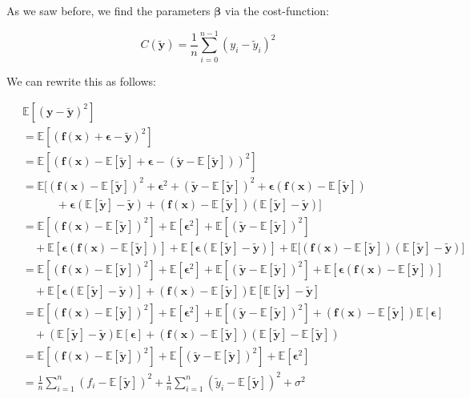 \documentclass[12pt]{extarticle}
\begin{document}
As we saw before, we find the parameters $\bm{\beta}$ via the cost-function: 

\begin{equation*}
    C(\bm{\tilde{y}}) = \frac{1}{n} \sum_{i=0}^{n-1} (y_i - \tilde{y}_i)^2
\end{equation*}

We can rewrite this as follows:

\begin{equation*}
\begin{aligned}
 &\mathds{E}[(\bm{y}-\bm{\tilde{y}})^2]\\
 &=\mathds{E}[(\bm{f}(\bm{x})+\bm{\epsilon}-\bm{\tilde{y}})^2]\\
 &= \mathds{E}[(\bm{f}(\bm{x})-\mathds{E}[\bm{\tilde{y}}]+\bm{\epsilon}-(\bm{\tilde{y}}-\mathds{E}[\bm{\tilde{y}}]))^2]\\
 &= \mathds{E}\Big[(\bm{f}(\bm{x})-\mathds{E}[\bm{\tilde{y}}])^2+\bm{\epsilon}^2+(\bm{\tilde{y}}-\mathds{E}[\bm{\tilde{y}}])^2+\bm{\epsilon}(\bm{f}(\bm{x})-\mathds{E}[\bm{\tilde{y}}])\\
 &\qquad \quad +\bm{\epsilon}(\mathds{E}[\bm{\tilde{y}}]-\bm{\tilde{y}})+(\bm{f}(\bm{x})-\mathds{E}[\bm{\tilde{y}}])(\mathds{E}[\bm{\tilde{y}}]-\bm{\tilde{y}})\Big]\\\
 &= \mathds{E}[(\bm{f}(\bm{x})-\mathds{E}[\bm{\tilde{y}}])^2] + \mathds{E}[\bm{\epsilon}^2] + \mathds{E}[(\bm{\tilde{y}}-\mathds{E}[\bm{\tilde{y}}])^2]\\
 &\quad+\mathds{E}[\bm{\epsilon}(\bm{f}(\bm{x})-\mathds{E}[\bm{\tilde{y}}])] +  \mathds{E}[\bm{\epsilon}(\mathds{E}[\bm{\tilde{y}}]-\bm{\tilde{y}})] + \mathds{E}\big[(\bm{f}(\bm{x})-\mathds{E}[\bm{\tilde{y}}])(\mathds{E}[\bm{\tilde{y}}]-\bm{\tilde{y}})\big]\\
 &= \mathds{E}[(\bm{f}(\bm{x})-\mathds{E}[\bm{\tilde{y}}])^2] + \mathds{E}[\bm{\epsilon}^2] + \mathds{E}[(\bm{\tilde{y}}-\mathds{E}[\bm{\tilde{y}}])^2]+ \mathds{E}[\bm{\epsilon}(\bm{f}(\bm{x})-\mathds{E}[\bm{\tilde{y}}])] \\
 &\quad+\mathds{E}[\bm{\epsilon}(\mathds{E}[\bm{\tilde{y}}]-\bm{\tilde{y}})] + (\bm{f}(\bm{x})-\mathds{E}[\bm{\tilde{y}}])\mathds{E}[\mathds{E}[\bm{\tilde{y}}]-\bm{\tilde{y}}]\\
  &= \mathds{E}[(\bm{f}(\bm{x})-\mathds{E}[\bm{\tilde{y}}])^2] + \mathds{E}[\bm{\epsilon}^2] + \mathds{E}[(\bm{\tilde{y}}-\mathds{E}[\bm{\tilde{y}}])^2]+ (\bm{f}(\bm{x})-\mathds{E}[\bm{\tilde{y}}])\mathds{E}[\bm{\epsilon}] \\
 &\quad+(\mathds{E}[\bm{\tilde{y}}]-\bm{\tilde{y}})\mathds{E}[\bm{\epsilon}] + (\bm{f}(\bm{x})-\mathds{E}[\bm{\tilde{y}}])(\mathds{E}[\bm{\tilde{y}}]-\mathds{E}[\bm{\tilde{y}}])\\
&= \mathds{E}[(\bm{f}(\bm{x})-\mathds{E}[\bm{\tilde{y}}])^2] + \mathds{E}[(\bm{\tilde{y}}-\mathds{E}[\bm{\tilde{y}}])^2] + \mathds{E}[\bm{\epsilon}^2]\\
 &= \frac{1}{n} \sum_{i=1}^n (f_i - \mathds{E}[\bm{\tilde{y}}])^2 + \frac{1}{n} \sum_{i=1}^n (\tilde{y}_i - \mathds{E}[\bm{\tilde{y}}])^2 + \sigma^2
\end{aligned}
\end{equation*}
\end{document}
